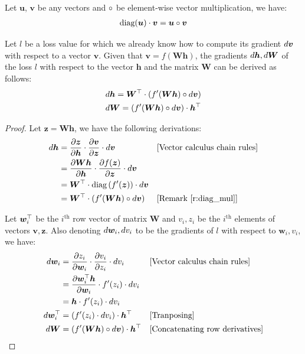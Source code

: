\begin{remark}
\label{r:diag_mul}
Let $\bm{u}$, $\bm{v}$ be any vectors and $\circ$ be element-wise vector multiplication, we have:
\begin{align}
\text{diag} (\bm{u}) \cdot \bm{v} = \bm{u} \circ \bm{v}
\end{align}
\end{remark}

\begin{lemma}
\label{l:chain_rule}
Let $l$ be a loss value for which we
already know how to compute its gradient $d\bm{v}$ with respect to a vector $\bm{v}$. Given that
$\bm{v} = f(\bm{Wh})$, the gradients $d\bm{h}, d\bm{W}$ of the loss $l$ with respect to the vector
$\bm{h}$ and the matrix $\bm{W}$ can be derived as follows:
\begin{align}
d\bm{h} = \bm{W}^\top \cdot \left(f'(\bm{Wh}) \circ d\bm{v}\right)
\\
d\bm{W} = \left(f'(\bm{Wh}) \circ d\bm{v}\right) \cdot \bm{h}^\top 
\end{align}
\end{lemma}

\begin{proof}
Let $\bm{z} = \bm{Wh}$, we have the following derivations: %
\begin{align*}
\der{h} &= \fracder{\bm{z}}{\bm{h}} \cdot \fracder{\bm{v}}{\bm{z}}
\cdot \der{v} && \text{[Vector calculus chain rules]}\\
&= \fracder{\bm{Wh}}{\bm{h}} \cdot \fracder{f(\bm{z})}{\bm{z}}
\cdot \der{v} \\
&=\tp{\bm{W}} \cdot \diag \paren{f'(\bm{z})} \cdot \der{v} \\
&=\tp{\bm{W}} \cdot \paren{f'(\bm{Wh}) \edot \der{v}} &&
\text{[\remarkref{r:diag_mul}]}
\end{align*}

Let $\bm{w}_i^\top$ be the $i^{\text{th}}$ row vector of matrix $\bm{W}$ and
$v_i, z_i$ be the $i^{\text{th}}$ elements of vectors $\bm{v}, \bm{z}$. Also
denoting $d\bm{w}_i, dv_i$ to be the gradients of $l$ with respect to $\bm{w}_i,
v_i$, we have:
\begin{align*}
d\bm{w}_i &= \frac{\partial z_i}{\partial \bm{w}_i} \cdot \frac{\partial v_i}{\partial z_i}
\cdot dv_i && \text{[Vector calculus chain rules]}\\
&= \frac{\partial \bm{w}_i^\top\bm{h}}{\partial \bm{w}_i} \cdot f'(z_i) \cdot dv_i \\
&= \bm{h} \cdot f'(z_i) \cdot dv_i \\ 
d\bm{w}_i^\top &= \left(f'(z_i) \cdot dv_i\right) \cdot
\bm{h}^\top && \text{[Tranposing]} \\
d\bm{W} &= \left(f'(\bm{Wh}) \circ d\bm{v}\right) \cdot \bm{h}^\top
&& \text{[Concatenating row derivatives]}
\end{align*}
\end{proof}

